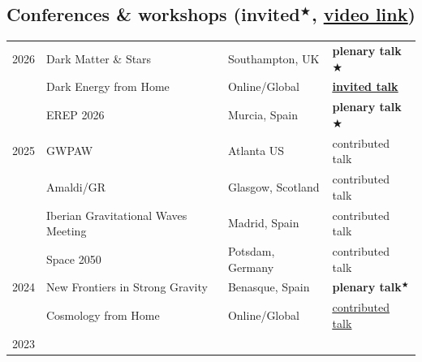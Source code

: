 \documentclass[11pt,a4paper]{article}
\begin{document}
\subsection*{Conferences \& workshops
 \hfill {\small  (invited$^\bigstar$, \href{https://miguelzumalacarregui.es/talks.html}{\underline{video link}}}) \quad} %
\vspace{-.3cm}
\begin{longtable}{l p{} p{3.5cm} p{3cm}}
2026  & Dark Matter \& Stars & Southampton, UK & \textbf{plenary talk$\bigstar$}\\
& Dark Energy from Home & Online/Global &{\textbf{\href{https://youtu.be/1k0o0QiL288}{\underline{invited talk}}}} \\
& EREP 2026 & Murcia, Spain & \textbf{plenary talk$\bigstar$}\\
2025 & GWPAW & Atlanta US &{contributed talk} \\
& Amaldi/GR & Glasgow, Scotland &{contributed talk} \\
   & Iberian Gravitational Waves Meeting & Madrid, Spain &{contributed talk} \\
   & Space 2050 & Potsdam, Germany & contributed talk \\
2024  & New Frontiers in Strong Gravity & Benasque, Spain & \textbf{{plenary talk}$^\bigstar$}
\\
 & Cosmology from Home & Online/Global & \href{https://youtu.be/cNc5VilkQH0?si=aw9emqQXW-r_2Nvr}{\underline{contributed talk}}
\\
2023  

\end{longtable}
\end{document}
